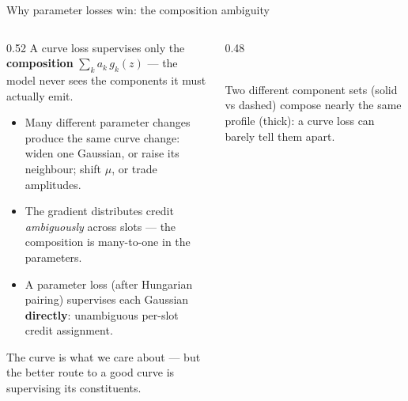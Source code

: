 \begin{frame}{Why parameter losses win: the composition ambiguity}
  \begin{columns}[T]
    \begin{column}{0.52\textwidth}
      \small
      A curve loss supervises only the \textbf{composition} $\sum_k a_k\, g_k(z)$ ---
      the model never sees the components it must actually emit.
      \begin{itemize}
        \item Many different parameter changes produce the same curve change: widen one
              Gaussian, or raise its neighbour; shift $\mu$, or trade amplitudes.
        \item The gradient distributes credit \emph{ambiguously} across slots --- the
              composition is many-to-one in the parameters.
        \item A parameter loss (after Hungarian pairing) supervises each Gaussian
              \textbf{directly}: unambiguous per-slot credit assignment.
      \end{itemize}
      {\scriptsize\color{accent} The curve is what we care about --- but the better route
      to a good curve is supervising its constituents.\par}
    \end{column}
    \begin{column}{0.48\textwidth}
      \centering
      \\ {\scriptsize Two different component sets (solid vs dashed) compose nearly the
      same profile (thick): a curve loss can barely tell them apart.}
    \end{column}
  \end{columns}
\end{frame}

